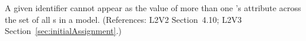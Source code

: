 A given identifier cannot appear as the value of more than one
\InitialAssignment{}'s  attribute across
the set of all \InitialAssignment{}s in a model.  (References:
L2V2 Section~4.10; L2V3
Section~\ref{sec:initialAssignment}.)
